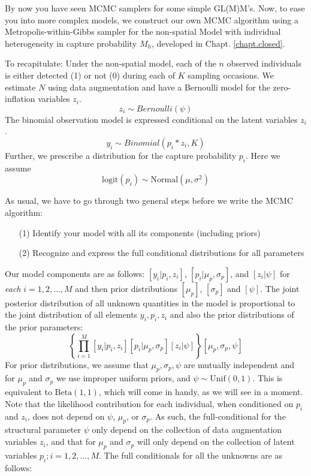 By now you have seen MCMC samplers for some simple GL(M)M's. Now, to
ease you into more complex models, we construct our own MCMC algorithm
using a Metropolis-within-Gibbs sampler for the non-spatial Model with
individual heterogeneity in capture probability $M_{h}$, developed in
Chapt. \ref{chapt.closed}.

To recapitulate: Under the non-spatial model, each of the $n$ observed
individuals is either detected (1) or not (0) during each of $K$
sampling occasions. We estimate $N$ using data augmentation and have a
Bernoulli model for the zero-inflation variables $z_{i}$. 
\[
z_{i} \sim Bernoulli(\psi)
\]
The binomial
observation model is expressed conditional on the latent variables
$z_{i}$. 
\[
y_i \sim Binomial (p_i * z_i, K)
\]
Further, we prescribe a distribution for the capture
probability $p_{i}$. Here we assume
\[
\mathrm{logit}(p_{i}) \sim \mbox{Normal}(\mu,\sigma^2)
\]

As usual, we have to go through two general steps before we write the MCMC algorithm:
\begin{itemize}
\item[  (1)] Identify your model with all its components (including
    priors)
\item[  (2)] Recognize and express the full conditional distributions for
    all parameters
\end{itemize}
Our model components are as follows: $[y_{i}| p_{i},z_{i}]$,
$[p_{i}|\mu_{p},\sigma_{p}]$, and $[z_{i}|\psi]$
for {\it each} $i=1,2,\ldots,M$ and then prior distributions
$[\mu_{p}]$, $[\sigma_{p}]$ and $[\psi]$.
The joint posterior distribution of all unknown quantities in the model
is proportional to the joint distribution of all elements
$y_{i},p_{i},z_{i}$ and also the prior distributions of the prior parameters:
\[
\left\{ \prod_{i=1}^{M} [y_{i}|p_{i},z_{i}][p_{i}|\mu_{p},\sigma_{p}]
[z_{i}|\psi] \right\} [\mu_{p},\sigma_{p},\psi]
\]
For prior distributions, we assume that $\mu_{p},\sigma_{p}, \psi$ are
mutually independent and for $\mu_{p}$ and $\sigma_{p}$ we use
improper uniform priors, and $\psi \sim \mbox{Unif}(0,1)$.  This is equivalent to $\mbox{Beta}(1,1)$, which will come in handy, as we will see in a moment. Note that
the likelihood contribution for each individual, when conditioned on
$p_{i}$ and $z_{i}$, does not depend on $\psi$, $\mu_{p}$, or
$\sigma_{p}$.  As such, the full-conditional for the structural
parameter $\psi$ only depend on the collection of data augmentation
variables $z_{i}$, and that for $\mu_{p}$ and $\sigma_{p}$ will only
depend on the collection of latent variables $p_{i}; i=1,2,\ldots,M$.
The full conditionals for all the unknowns are as follows:

